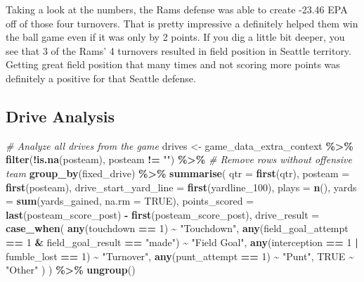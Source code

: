 \documentclass[
]{article}
\newenvironment{Shaded}{\begin{snugshade}}{\end{snugshade}}
\newcommand{\AttributeTok}[1]{\textcolor[rgb]{0.13,0.29,0.53}{#1}}
\newcommand{\CommentTok}[1]{\textcolor[rgb]{0.56,0.35,0.01}{\textit{#1}}}
\newcommand{\ConstantTok}[1]{\textcolor[rgb]{0.56,0.35,0.01}{#1}}
\newcommand{\DecValTok}[1]{\textcolor[rgb]{0.00,0.00,0.81}{#1}}
\newcommand{\FunctionTok}[1]{\textcolor[rgb]{0.13,0.29,0.53}{\textbf{#1}}}
\newcommand{\NormalTok}[1]{#1}
\newcommand{\OtherTok}[1]{\textcolor[rgb]{0.56,0.35,0.01}{#1}}
\newcommand{\SpecialCharTok}[1]{\textcolor[rgb]{0.81,0.36,0.00}{\textbf{#1}}}
\newcommand{\StringTok}[1]{\textcolor[rgb]{0.31,0.60,0.02}{#1}}
\begin{document}
Taking a look at the numbers, the Rams defense was able to create -23.46
EPA off of those four turnovers. That is pretty impressive a definitely
helped them win the ball game even if it was only by 2 points. If you
dig a little bit deeper, you see that 3 of the Rams' 4 turnovers
resulted in field position in Seattle territory. Getting great field
position that many times and not scoring more points was definitely a
positive for that Seattle defense.

\subsection{Drive Analysis}\label{drive-analysis}

\begin{Shaded}
\begin{Highlighting}[]
\CommentTok{\# Analyze all drives from the game}
\NormalTok{drives }\OtherTok{\textless{}{-}}\NormalTok{ game\_data\_extra\_context }\SpecialCharTok{\%\textgreater{}\%}
  \FunctionTok{filter}\NormalTok{(}\SpecialCharTok{!}\FunctionTok{is.na}\NormalTok{(posteam), posteam }\SpecialCharTok{!=} \StringTok{""}\NormalTok{) }\SpecialCharTok{\%\textgreater{}\%}  \CommentTok{\# Remove rows without offensive team}
  \FunctionTok{group\_by}\NormalTok{(fixed\_drive) }\SpecialCharTok{\%\textgreater{}\%}
  \FunctionTok{summarise}\NormalTok{(}
    \AttributeTok{qtr =} \FunctionTok{first}\NormalTok{(qtr),}
    \AttributeTok{posteam =} \FunctionTok{first}\NormalTok{(posteam),}
    \AttributeTok{drive\_start\_yard\_line =} \FunctionTok{first}\NormalTok{(yardline\_100),}
    \AttributeTok{plays =} \FunctionTok{n}\NormalTok{(),}
    \AttributeTok{yards =} \FunctionTok{sum}\NormalTok{(yards\_gained, }\AttributeTok{na.rm =} \ConstantTok{TRUE}\NormalTok{),}
    \AttributeTok{points\_scored =} \FunctionTok{last}\NormalTok{(posteam\_score\_post) }\SpecialCharTok{{-}} \FunctionTok{first}\NormalTok{(posteam\_score\_post),}
    \AttributeTok{drive\_result =} \FunctionTok{case\_when}\NormalTok{(}
      \FunctionTok{any}\NormalTok{(touchdown }\SpecialCharTok{==} \DecValTok{1}\NormalTok{) }\SpecialCharTok{\textasciitilde{}} \StringTok{"Touchdown"}\NormalTok{,}
      \FunctionTok{any}\NormalTok{(field\_goal\_attempt }\SpecialCharTok{==} \DecValTok{1} \SpecialCharTok{\&}\NormalTok{ field\_goal\_result }\SpecialCharTok{==} \StringTok{"made"}\NormalTok{) }\SpecialCharTok{\textasciitilde{}} \StringTok{"Field Goal"}\NormalTok{,}
      \FunctionTok{any}\NormalTok{(interception }\SpecialCharTok{==} \DecValTok{1} \SpecialCharTok{|}\NormalTok{ fumble\_lost }\SpecialCharTok{==} \DecValTok{1}\NormalTok{) }\SpecialCharTok{\textasciitilde{}} \StringTok{"Turnover"}\NormalTok{,}
      \FunctionTok{any}\NormalTok{(punt\_attempt }\SpecialCharTok{==} \DecValTok{1}\NormalTok{) }\SpecialCharTok{\textasciitilde{}} \StringTok{"Punt"}\NormalTok{,}
      \ConstantTok{TRUE} \SpecialCharTok{\textasciitilde{}} \StringTok{"Other"}
\NormalTok{    )}
\NormalTok{  ) }\SpecialCharTok{\%\textgreater{}\%}
  \FunctionTok{ungroup}\NormalTok{()}
\end{Highlighting}
\end{Shaded}
\end{document}
